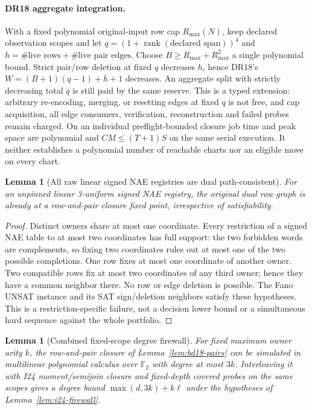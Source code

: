 \documentclass[11pt]{article}
\newtheorem{lemma}[theorem]{Lemma}
\begin{document}
\paragraph{DR18 aggregate integration.} With a fixed polynomial original-input row cap $R_{\max}(N)$, keep declared observation scopes and let $q=(1+\operatorname{rank}(\text{declared span}))^4$ and $h=\#\text{live rows}+\#\text{live pair edges}$. Choose $B\ge R_{\max}+R_{\max}^2$ a single polynomial bound. Strict pair/row deletion at fixed $q$ decreases $h$, hence DR18's $W=(B+1)(q-1)+h+1$ decreases. An aggregate split with strictly decreasing total $q$ is still paid by the same reserve. This is a typed extension: arbitrary re-encoding, merging, or resetting edges at fixed $q$ is not free, and cap acquisition, all edge consumers, verification, reconstruction and failed probes remain charged. On an individual preflight-bounded closure job time and peak space are polynomial and $CM\le(T+1)S$ on the same serial execution. It neither establishes a polynomial number of reachable charts nor an eligible move on every chart.
\begin{lemma}[All raw linear signed NAE registries are dual path-consistent]\label{lem:bd18-stall}
For an unpinned linear 3-uniform signed NAE registry, the original dual row graph is already at a row-and-pair closure fixed point, irrespective of satisfiability.
\end{lemma}
\begin{proof}
Distinct owners share at most one coordinate. Every restriction of a signed NAE table to at most two coordinates has full support: the two forbidden words are complements, so fixing two coordinates rules out at most one of the two possible completions. One row fixes at most one coordinate of another owner. Two compatible rows fix at most two coordinates of any third owner; hence they have a common neighbor there. No row or edge deletion is possible. The Fano UNSAT instance and its SAT sign/deletion neighbors satisfy these hypotheses. This is a restriction-specific failure, not a decision lower bound or a simultaneous hard sequence against the whole portfolio.
\end{proof}
\begin{lemma}[Combined fixed-scope degree firewall]\label{lem:bd18-firewall}
For fixed maximum owner arity $k$, the row-and-pair closure of Lemma~\ref{lem:bd18-pairs} can be simulated in multilinear polynomial calculus over $\mathbb F_2$ with degree at most $3k$. Interleaving it with I24 moment/semijoin closure and fixed-depth covered probes on the same scopes gives a degree bound $\max(d,3k)+k\ell$ under the hypotheses of Lemma~\ref{lem:i24-firewall}.
\end{lemma}
\end{document}

